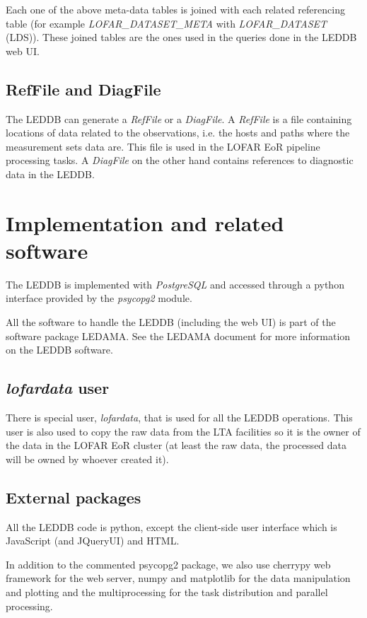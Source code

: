 \documentclass[a4paper,11pt]{article}
\begin{document}
Each one of the above meta-data tables is joined with each related referencing table (for example \textit{LOFAR\_DATASET\_META} with \textit{LOFAR\_DATASET} (LDS)). These joined tables are the ones used in the queries done in the LEDDB web UI.

\subsection{RefFile and DiagFile}

The LEDDB can generate a \textit{RefFile} or a \textit{DiagFile}. A \textit{RefFile} is a file containing locations of data related to the observations, i.e. the hosts and paths where the measurement sets data are. This file is used in the LOFAR EoR pipeline processing tasks. A \textit{DiagFile} on the other hand contains references to diagnostic data in the LEDDB.

\section{Implementation and related software}

The LEDDB is implemented with \textit{PostgreSQL} and accessed through a python interface provided by the \textit{psycopg2} module.

All the software to handle the LEDDB (including the web UI) is part of the software package LEDAMA. See the LEDAMA document for more information on the LEDDB software.

\subsection{\textit{lofardata} user}

There is special user, \textit{lofardata}, that is used for all the LEDDB operations. This user is also used to copy the raw data from the LTA facilities so it is the owner of the data in the LOFAR EoR cluster (at least the raw data, the processed data will be owned by whoever created it).   

\subsection{External packages}

All the LEDDB code is python, except the client-side user interface which is JavaScript (and JQueryUI) and HTML.

In addition to the commented psycopg2 package, we also use cherrypy web framework for the web server, numpy and matplotlib for the data manipulation and plotting and the multiprocessing for the task distribution and parallel processing.
\end{document}
